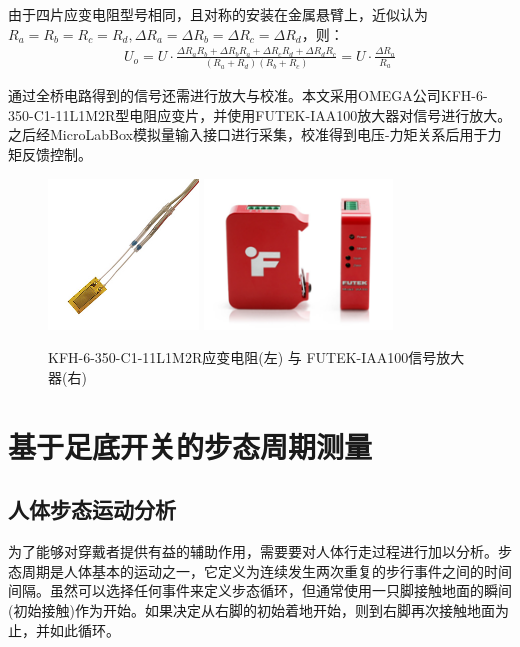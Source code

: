 由于四片应变电阻型号相同，且对称的安装在金属悬臂上，近似认为$R_a = R_b = R_c = R_d,\Delta R_a = \Delta R_b = \Delta R_c = \Delta R_d$，则：
\begin{align}
U_o = U\cdot \frac{\Delta R_a R_b + \Delta R_b R_a + \Delta R_c R_d + \Delta R_d R_c}{(R_a + R_d)(R_b + R_c)}= U\cdot \frac{\Delta R_a}{R_a}
\end{align}

通过全桥电路得到的信号还需进行放大与校准。本文采用OMEGA公司KFH-6-350-C1-11L1M2R型电阻应变片，并使用FUTEK-IAA100放大器对信号进行放大。之后经MicroLabBox模拟量输入接口进行采集，校准得到电压-力矩关系后用于力矩反馈控制。
\begin{figure}[htb]
    \includegraphics[width=4cm]{fig/f28.jpg}\quad\quad
    \includegraphics[width=5cm]{fig/f28.png}
    \caption{KFH-6-350-C1-11L1M2R应变电阻(左) 与 FUTEK-IAA100信号放大器(右)}
    \label{fig:subfigss}
\end{figure}
\section{基于足底开关的步态周期测量}
\subsection{人体步态运动分析}

为了能够对穿戴者提供有益的辅助作用，需要要对人体行走过程进行加以分析。步态周期是人体基本的运动之一，它定义为连续发生两次重复的步行事件之间的时间间隔。虽然可以选择任何事件来定义步态循环，但通常使用一只脚接触地面的瞬间(初始接触)作为开始。如果决定从右脚的初始着地开始，则到右脚再次接触地面为止，并如此循环。

